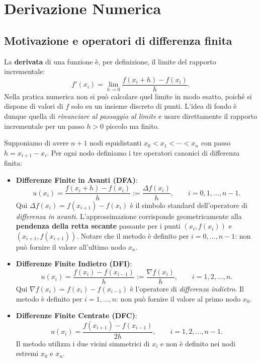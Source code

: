 \documentclass[a4paper,12pt]{article}
\theoremstyle{definition}
\theoremstyle{remark}
\begin{document}
\section{Derivazione Numerica}

\subsection{Motivazione e operatori di differenza finita}

La \textbf{derivata} di una funzione è, per definizione, il limite del rapporto incrementale:
\[
  f'(x_i) = \lim_{h \to 0} \frac{f(x_i + h) - f(x_i)}{h}.
\]
Nella pratica numerica non si può calcolare quel limite in modo esatto, poiché
si dispone di valori di $f$ solo su un insieme discreto di punti.
L'idea di fondo è dunque quella di \emph{rinunciare al passaggio al limite}
e usare direttamente il rapporto incrementale per un passo $h > 0$ piccolo
ma finito.

\medskip
Supponiamo di avere $n+1$ nodi equidistanti
$x_0 < x_1 < \cdots < x_n$ con passo $h = x_{i+1} - x_i$.
Per ogni nodo definiamo i tre operatori canonici di differenza finita:

\begin{itemize}
  \item \textbf{Differenze Finite in Avanti (DFA)}:
    \[
      u(x_i) = \frac{f(x_i + h) - f(x_i)}{h}
             := \frac{\Delta f(x_i)}{h}, \qquad i = 0,1,\ldots,n-1.
    \]
    Qui $\Delta f(x_i) = f(x_{i+1}) - f(x_i)$ è il simbolo standard dell'operatore
    di \emph{differenza in avanti}.
    L'approssimazione corrisponde geometricamente alla \textbf{pendenza della
    retta secante} passante per i punti $(x_i, f(x_i))$ e
    $(x_{i+1}, f(x_{i+1}))$.
    Notare che il metodo è definito per $i = 0, \ldots, n-1$: non può fornire
    il valore all'ultimo nodo $x_n$.

  \item \textbf{Differenze Finite Indietro (DFI)}:
    \[
      u(x_i) = \frac{f(x_i) - f(x_{i-1})}{h}
             := \frac{\nabla f(x_i)}{h}, \qquad i = 1,2,\ldots,n.
    \]
    Qui $\nabla f(x_i) = f(x_i) - f(x_{i-1})$ è l'operatore di
    \emph{differenza indietro}.
    Il metodo è definito per $i = 1, \ldots, n$: non può fornire il valore al
    primo nodo $x_0$.

  \item \textbf{Differenze Finite Centrate (DFC)}:
    \[
      u(x_i) = \frac{f(x_{i+1}) - f(x_{i-1})}{2h}, \qquad i = 1,2,\ldots,n-1.
    \]
    Il metodo utilizza i due vicini simmetrici di $x_i$ e non è definito nei
    nodi estremi $x_0$ e $x_n$.
\end{itemize}
\end{document}
